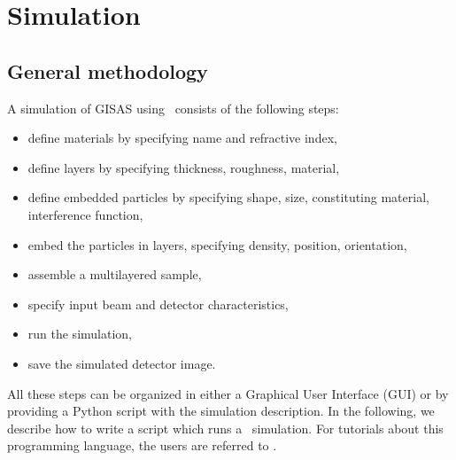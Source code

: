 

\newpage
\chapter{Simulation}  


\section{General methodology}

A simulation of GISAS using \BornAgain\ consists of the following steps:
\begin{itemize}
\item define materials by specifying name and refractive index,
\item define layers by specifying thickness, roughness, material,
\item define embedded particles by specifying shape, size,
   constituting material, interference function,
\item embed the particles in layers, specifying density, position, orientation, 
\item assemble a multilayered sample,
\item specify input beam and detector characteristics,
\item run the simulation,
\item save the simulated detector image.
\end{itemize}

\noindent
All these steps can be organized in either a Graphical User Interface (GUI) or by providing a Python script with the simulation description. 
In the following, we describe how to write a 
 script which runs a \BornAgain\ simulation. For tutorials about this programming language, the users are referred to \cite{Lut09}.




